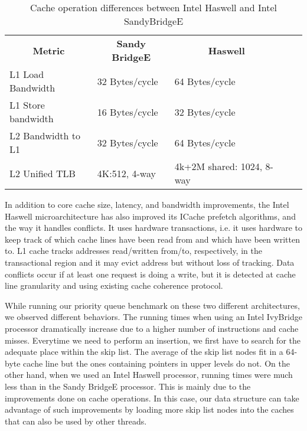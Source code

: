 \begin{table}[ht]
\footnotesize
\begin{tabular}{|l|l|l|ll}
\cline{1-3}
\multicolumn{1}{|c|}{\textbf{Metric}} & \multicolumn{1}{c|}{\textbf{Sandy BridgeE}} & \multicolumn{1}{c|}{\textbf{Haswell}} &  &  \\ \cline{1-3}
L1 Load Bandwidth                     & 32 Bytes/cycle                           & 64 Bytes/cycle                        &  &  \\ \cline{1-3}
L1 Store bandwidth                    & 16 Bytes/cycle                           & 32 Bytes/cycle                        &  &  \\ \cline{1-3}
L2 Bandwidth to L1                    & 32 Bytes/cycle                           & 64 Bytes/cycle                        &  &  \\ \cline{1-3}
L2 Unified TLB                        & 4K:512, 4-way                            & 4k+2M shared: 1024, 8-way             &  &  \\ \cline{1-3}
\end{tabular}
\caption{Cache operation differences between Intel Haswell and Intel SandyBridgeE}
\label{tab:haswell_ivy}
\end{table}

In addition to core cache size, latency, and bandwidth improvements, the Intel Haswell microarchitecture has also improved its ICache prefetch algorithms, and the way it handles conflicts. It uses hardware transactions, i.e. it uses hardware to keep track of which cache lines have been read from and which have been written to. L1 cache tracks addresses read/written from/to, respectively, in the transactional region and it may evict address but without loss of tracking. Data conflicts occur if at least one request is doing a write, but it is detected at cache line granularity and using existing cache coherence protocol.%

While running our priority queue benchmark on these two different architectures, we observed different behaviors. The running times when using an Intel IvyBridge processor dramatically increase due to a higher number of instructions and cache misses. Everytime we need to perform an insertion, we first have to search for the adequate place within the skip list. The average of the skip list nodes fit in a 64-byte cache line but the ones containing pointers in upper levels do not. On the other hand, when we used an Intel Haswell processor, running times were much less than in the Sandy BridgeE processor. This is mainly due to the improvements done on cache operations. In this case, our data structure can take advantage of such improvements by loading more skip list nodes into the caches that can also be used by other threads.

